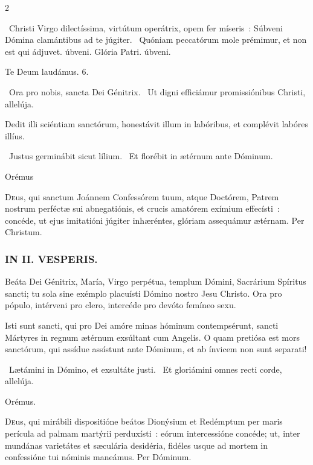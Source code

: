 \documentclass[9pt,twoside]{extarticle}
\begin{document}
\begin{multicols}{2}
\begin{tightlist}{}
\item {}~Christi Virgo dilectíssima, virtútum operátrix, opem fer míseris~: \textred{*} Súbveni Dómina clamántibus ad te júgiter. ~Quóniam peccatórum mole prémimur, et non est qui ádjuvet. úbveni. Glória Patri. úbveni.
\item Te Deum laudámus. 6.
\item {}~Ora pro nobis, sancta Dei Génitrix. ~Ut digni efficiámur promissiónibus Christi, allelúja.
\item {} Dedit illi sciéntiam sanctórum, honestávit illum in labóribus, et complévit labóres illíus.
\item {}~Justus germinábit sicut lílium. ~Et florébit in ætérnum ante Dóminum.
\item Orémus \hfill {}
\end{tightlist}
\lettrine{D}eus, qui sanctum Joánnem Confessórem tuum, atque Doctórem, Patrem nostrum perféctæ sui abnegatiónis, et crucis amatórem exímium effecísti~: concéde, ut ejus imitatióni júgiter inhæréntes, glóriam assequámur ætérnam. Per Christum.

\begin{tightlist}{}
\item {}
\end{tightlist}

\subsubsection*{\center \textsc{IN II. VESPERIS.}}
\begin{tightlist}{}
\item {} Beáta Dei Génitrix, María, Virgo perpétua, templum Dómini, Sacrárium Spíritus sancti; tu sola sine exémplo placuísti Dómino nostro Jesu Christo. Ora pro pópulo, intérveni pro clero, intercéde pro devóto femíneo sexu.
\item {} Isti sunt sancti, qui pro Dei amóre minas hóminum contempsérunt, sancti Mártyres in regnum ætérnum exsúltant cum Angelis. O quam pretiósa est mors sanctórum, qui assídue assístunt ante Dóminum, et ab ínvicem non sunt separati!
\item {}~Lætámini in Dómino, et exsultáte justi. ~Et gloriámini omnes recti corde, allelúja.
\item Orémus. \hfill {}
\end{tightlist}
\lettrine{D}eus, qui mirábili dispositióne beátos Dionýsium et Redémptum per maris perícula ad palmam martýrii perduxísti~: eórum intercessióne concéde; ut, inter mundánas varietátes et sæculária desidéria, fidéles usque ad mortem in confessióne tui nóminis maneámus. Per Dóminum.


\end{multicols}
\end{document}
